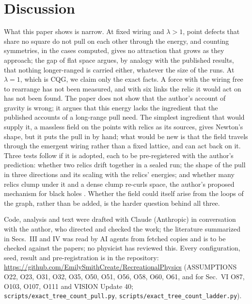 \documentclass[pre,twocolumn,superscriptaddress,nofootinbib]{revtex4-2}
\begin{document}
\section{Discussion}

What this paper shows is narrow. At fixed wiring and $\lambda > 1$, point defects that share no square do not pull on
each other through the energy, and counting symmetries, in the cases computed, gives no attraction that grows as they
approach; the gap of flat space argues, by analogy with the published results, that
nothing longer-ranged is carried either, whatever the size of the runs. At $\lambda = 1$, which is CQG, we claim only
the exact facts. A force with the wiring free to rearrange has not been measured, and with six links the relic it
would act on has not been found. The paper does not show that the author's account of gravity is wrong; it argues
that this energy lacks the ingredient that the published accounts of a long-range pull need. The simplest ingredient
that would supply it, a massless field on the points with relics as its sources, gives Newton's shape, but it puts the
pull in by hand; what would be new is that the field travels through the emergent wiring rather than a fixed lattice,
and can act back on it. Three tests follow if it is adopted, each to be pre-registered with the author's prediction:
whether two relics drift together in a sealed run; the shape of the pull in three directions and its scaling with the
relics' energies; and whether many relics clump under it and a dense clump re-curls space, the author's proposed
mechanism for black holes \cite{paper4}. Whether the field could itself arise from
the loops of the graph, rather than be added, is the harder question behind all three.

\begin{acknowledgments}
Code, analysis and text were drafted with Claude (Anthropic) in conversation with the author, who directed and checked
the work; the literature summarized in Secs.~III and IV was read by AI agents from fetched copies and is to be checked
against the papers; no physicist has reviewed this. Every configuration, seed, result and pre-registration is in the
repository: \url{https://github.com/EmilySmithCreate/RecreationalPhysics} (ASSUMPTIONS O22, O23, O31, O32, O35, O50,
O51, O56, O58, O60, O61, and for Sec.~VI O87, O103, O107, O111 and VISION Update 40;
\texttt{scripts/exact\_tree\_count\_pull.py}, \texttt{scripts/exact\_tree\_count\_ladder.py}).
\end{acknowledgments}
\end{document}
